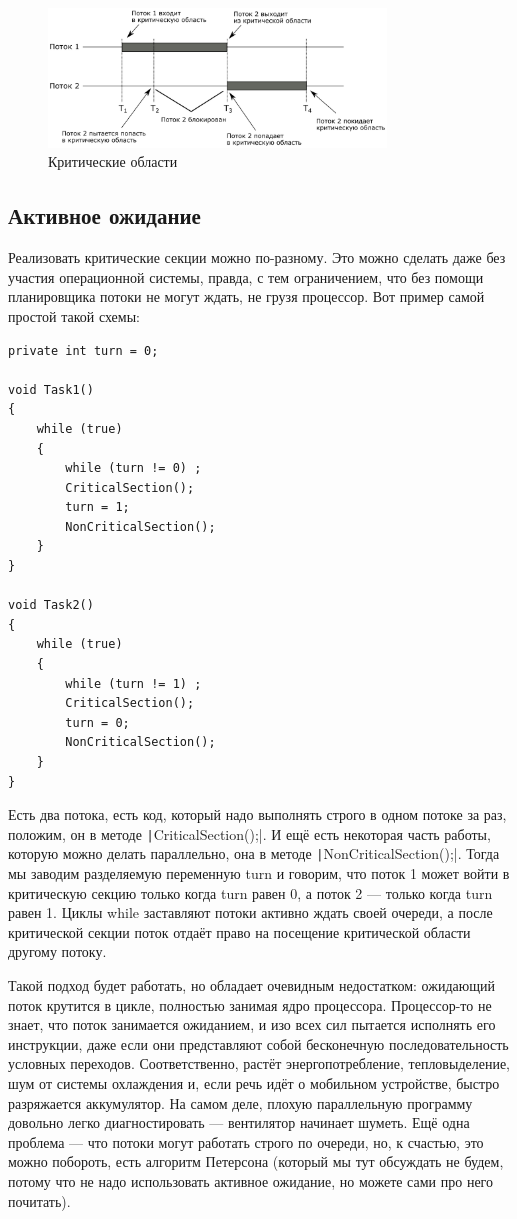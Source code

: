 \documentclass[a5paper]{article}
\begin{document}
\begin{figure}[ht]
    \centering
        \includegraphics[width=0.8\textwidth]{criticalSections.png}
    \caption{Критические области}
    \label{image:criticalSections}
\end{figure}

\subsection{Активное ожидание}

Реализовать критические секции можно по-разному. Это можно сделать даже без участия операционной системы, правда, с тем ограничением, что без помощи планировщика потоки не могут ждать, не грузя процессор. Вот пример самой простой такой схемы:

\begin{verbatim}
private int turn = 0;

void Task1()
{
    while (true)
    {
        while (turn != 0) ;
        CriticalSection();
        turn = 1;
        NonCriticalSection();
    }
}

void Task2()
{
    while (true)
    {
        while (turn != 1) ;
        CriticalSection();
        turn = 0;
        NonCriticalSection();
    }
}
\end{verbatim}

Есть два потока, есть код, который надо выполнять строго в одном потоке за раз, положим, он в методе \texttt|CriticalSection();|. И ещё есть некоторая часть работы, которую можно делать параллельно, она в методе \texttt|NonCriticalSection();|. Тогда мы заводим разделяемую переменную turn и говорим, что поток 1 может войти в критическую секцию только когда turn равен 0, а поток 2 --- только когда turn равен 1. Циклы while заставляют потоки активно ждать своей очереди, а после критической секции поток отдаёт право на посещение критической области другому потоку.

Такой подход будет работать, но обладает очевидным недостатком: ожидающий поток крутится в цикле, полностью занимая ядро процессора. Процессор-то не знает, что поток занимается ожиданием, и изо всех сил пытается исполнять его инструкции, даже если они представляют собой бесконечную последовательность условных переходов. Соответственно, растёт энергопотребление, тепловыделение, шум от системы охлаждения и, если речь идёт о мобильном устройстве, быстро разряжается аккумулятор. На самом деле, плохую параллельную программу довольно легко диагностировать --- вентилятор начинает шуметь. Ещё одна проблема --- что потоки могут работать строго по очереди, но, к счастью, это можно побороть, есть алгоритм Петерсона (который мы тут обсуждать не будем, потому что не надо использовать активное ожидание, но можете сами про него почитать).
\end{document}
